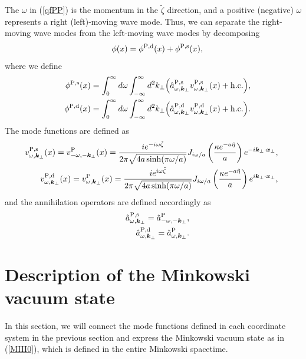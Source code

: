 \documentclass[aps,prd,preprintnumbers,nofootinbib,showpacs,11pt]{revtex4}%
\begin{document}
\begin{widetext}
The $\omega$ in (\ref{qfPP}) is the momentum 
in the $\tilde\zeta$ direction, and a positive (negative) $\omega$ represents a right (left)-moving wave mode. 
Thus, we can separate the right-moving wave modes from the left-moving wave modes by decomposing
\begin{eqnarray}
  &&\phi(x)=\phi^{\P,\d}(x)+\phi^{\P,\s}(x),
\label{phiPP}
\end{eqnarray}
where we define
\begin{eqnarray}
 &&\phi^{{\rm P},{\rm s}}(x)= \int_{0}^{\infty} 
 d \omega\int_{-\infty}^{\infty} d^2 k_\perp \Bigl({\hat a}_{\omega,{\bm k}_\perp}^{{\rm P},{\rm s}}v_{\omega,{\bm k}_\perp}^{{\rm P},{\rm s}}(x)
+ {\rm h.c.}
\Bigr),
\nonumber
\\
&&\phi^{{\rm P},{\rm d}}(x)= \int_{0}^{\infty} 
d \omega\int_{-\infty}^{\infty} d^2 k_\perp \Bigl( {\hat a}_{\omega,{\bm k}_\perp}^{{\rm P},{\rm d}}
v_{\omega,{\bm k}_\perp}^{{\rm P},{\rm d}}(x)
+{\rm h.c.}
\Bigr).
\nonumber
\end{eqnarray}
The mode functions are defined as 
\begin{eqnarray}
&&\hspace{-5mm}
v_{\omega,{\bm k}_\perp}^{\P,\s}(x)=v_{-\omega,-{\bm k}_\perp}^\P(x)
={ie^{-i\omega \tilde\zeta}\over 2\pi\sqrt{4a\sinh (\pi \omega/a)}}
J_{i\omega/a}\left({\kappa e^{-a\tilde\eta}\over a}\right)
e^{-i\bm k_\perp\cdot \bm x_\perp},
\label{vps}
\\
  &&\hspace{-5mm}
  v_{\omega,{\bm k}_\perp}^{\P,\d}(x)=v_{\omega,{\bm k}_\perp}^\P(x)
 ={ie^{i\omega \tilde\zeta}\over 2\pi\sqrt{4a\sinh (\pi \omega/a)}}
J_{i\omega/a}\left({\kappa e^{-a\tilde\eta}\over a}\right)
e^{i\bm k_\perp\cdot \bm x_\perp},
\label{vpd}
\end{eqnarray}
and the annihilation operators are defined accordingly as
\begin{eqnarray}
&&{\hat a}_{\omega,{\bm k}_\perp}^{{\rm P},{\rm s}}={\hat a}_{-\omega,-{\bm k}_\perp}^{{\rm P}},
\\
&&{\hat a}_{\omega,{\bm k}_\perp}^{{\rm P},{\rm d}}={\hat a}_{\omega,{\bm k}_\perp}^{{\rm P}}.
\end{eqnarray}



\section{Description of the Minkowski vacuum state }
In this section, we will connect the mode functions defined in each coordinate system
in the previous section and express the Minkowski vacuum state 
as in (\ref{MIII0}), which is defined in the entire Minkowski spacetime.

\end{widetext}
\end{document}
